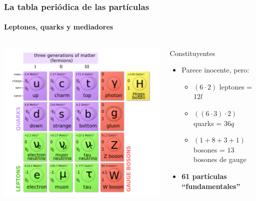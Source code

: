 \documentclass[xetex,mathserif,serif,10pt]{beamer}
\begin{document}
\begin{frame}
	\frametitle{La tabla periódica de las partículas}
  \framesubtitle{\alert{Leptones, quarks y mediadores}}
  \begin{columns}
    {\centering \includegraphics[width=1.00\columnwidth]{./figs/u01/standar-model-particles.png}}
    \begin{block}{Constituyentes}
			\begin{itemize}
        \color{chart01}{\item Materia}
        \color{chart09}{\item Interacciones}
        \color{chart07}{\item Masa}
        \item Parece inocente, pero:
			  \begin{itemize}
          \item $(6\cdot2)$ leptones = $12 l$
          \item $((6\cdot3)\cdot 2)$ quarks = $36 q$
          \item $(1+8+3+1)$ bosones = $13$ bosones de gauge
        \end{itemize}
        \item \bf{61 partículas ``fundamentales''}
      \end{itemize}
    \end{block}
  \end{columns}
\end{frame}
\end{document}
